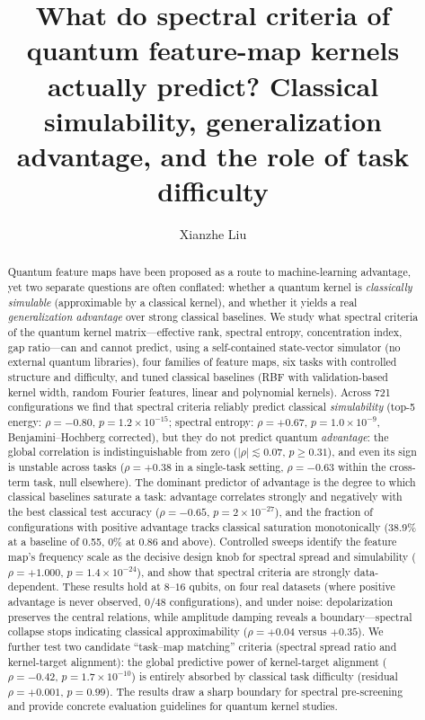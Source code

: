 \documentclass[aps,pra,preprint]{revtex4-2}
\title{What do spectral criteria of quantum feature-map kernels actually predict?
Classical simulability, generalization advantage, and the role of task difficulty}
\author{Xianzhe Liu}
\affiliation{School of Physics and Electronics, Hunan University, Changsha 410082, China}
\begin{document}
\maketitle

\begin{abstract}
Quantum feature maps have been proposed as a route to machine-learning advantage, yet
two separate questions are often conflated: whether a quantum kernel is \emph{classically
simulable} (approximable by a classical kernel), and whether it yields a real
\emph{generalization advantage} over strong classical baselines. We study what spectral
criteria of the quantum kernel matrix---effective rank, spectral entropy, concentration
index, gap ratio---can and cannot predict, using a self-contained state-vector simulator
(no external quantum libraries), four families of feature maps, six tasks with controlled
structure and difficulty, and tuned classical baselines (RBF with validation-based kernel
width, random Fourier features, linear and polynomial kernels). Across 721 configurations
we find that spectral criteria reliably predict classical \emph{simulability} (top-5
energy: $\rho=-0.80$, $p=1.2\times10^{-15}$; spectral entropy: $\rho=+0.67$,
$p=1.0\times10^{-9}$, Benjamini--Hochberg corrected), but they do not predict quantum
\emph{advantage}: the global correlation is indistinguishable from zero
($|\rho|\lesssim0.07$, $p\ge0.31$), and even its sign is unstable across tasks
($\rho=+0.38$ in a single-task setting, $\rho=-0.63$ within the cross-term task,
null elsewhere). The dominant predictor of advantage is the degree to which classical
baselines saturate a task: advantage correlates strongly and negatively with the best
classical test accuracy ($\rho=-0.65$, $p=2\times10^{-27}$), and the fraction of
configurations with positive advantage tracks classical saturation monotonically
(38.9\% at a baseline of 0.55, 0\% at 0.86 and above). Controlled sweeps identify the
feature map's frequency scale as the decisive design knob for spectral spread and
simulability ($\rho=+1.000$, $p=1.4\times10^{-24}$), and show that spectral criteria are
strongly data-dependent. These results hold at $8$--$16$ qubits, on four real datasets
(where positive advantage is never observed, $0/48$ configurations), and under noise:
depolarization preserves the central relations, while amplitude damping reveals a
boundary---spectral collapse stops indicating classical approximability
($\rho=+0.04$ versus $+0.35$). We further test two candidate ``task--map matching'' criteria
(spectral spread ratio and kernel-target alignment): the global predictive power of
kernel-target alignment ($\rho=-0.42$, $p=1.7\times10^{-10}$) is entirely absorbed by
classical task difficulty (residual $\rho=+0.001$, $p=0.99$). The results draw a sharp
boundary for spectral pre-screening and provide concrete evaluation guidelines for
quantum kernel studies.
\end{abstract}
\end{document}
